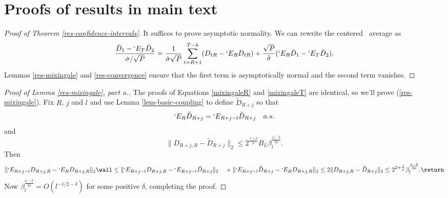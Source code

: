 \documentclass[11pt]{article}
\newcommand{\E}{`E}
\newcommand{\oosSum}[2]{\ensuremath{\sum_{#1=R+#2}^{T-\h}}}
\newcommand{\h}{h}
\newcommand{\CenteredAverage}{\frac{\bar{D}_1 - \E_T\bar{D}_2}{\hat\sigma / \sqrt{P}}}
\newcommand{\CenteredAverageI}{\ensuremath{\frac{1}{\hat\sigma
    \sqrt{P}}\oosSum{t}{1} (D_{tR} - \E_R D_{tR})}}
\newcommand{\CenteredAverageII}{\ensuremath{\frac{\sqrt{P}}{\hat\sigma}
    (\E_R\bar D_1 - \E_T\bar{D}_2)}}
\newcommand{\couplingConstant}{\ensuremath{2^{\frac{1+\rho}{\rho}} B_L}}
\newcommand{\couplingBeta}[1]{\ensuremath{\beta^{\frac{\rho-2}{2\rho}}_{#1}}}
\newcommand{\couplingBound}[1]{\couplingConstant \couplingBeta{#1}}
\begin{document}
\section{Proofs of results in main text}
\begin{proof}[Proof of Theorem \ref{res-confidence-intervals}]
It suffices to prove asymptotic normality.  We can rewrite the
centered \oos\ average as
  \[
    \CenteredAverage = \CenteredAverageI + \CenteredAverageII.
  \]
Lemmas \ref{res-mixingale} and 
\ref{res-convergence} ensure that the first term is asymptotically
normal and the second term vanishes.
\end{proof}

\begin{proof}[Proof of Lemma \ref{res-mixingale}, part a.]
The proofs of Equations \eqref{mixingaleR} and \eqref{mixingaleT} are
identical, so we'll prove (\ref{res-mixingale}).  Fix $R$, $j$ and $l$ and use Lemma
\ref{lem-basic-coupling} to define $\tilde{D}_{R+j}$ so that
\[\E_R\tilde D_{R+j} = \E_{R+j-l} \tilde D_{R+j} \quad a.s. \]
and
\[\lVert D_{R+j,R} - \tilde D_{R+j} \rVert_2 \leq \couplingBound{l}.\]
Then
\[
\lVert \E_{R+j-l} D_{R+j,R} - \E_R D_{R+j,R} \rVert_2 \wall \leq 
\lVert \E_{R+j-l} D_{R+j,R} - \E_{R+j-l} \tilde{D}_{R+j} \rVert_2 \\
\quad + \lVert
\E_{R+j-l} \tilde{D}_{R+j} - \E_R D_{R+j,R} \rVert_2 \\
\leq 2 \lVert D_{R+j,R} - \tilde D_{R+j} \rVert_2 \\
\leq 2^{2 + \frac1\rho}\couplingBeta{l}.\return
\]
Now $\couplingBeta{l} = O(l^{-1/2 - \delta})$ for some
positive $\delta$, completing the proof.
\end{proof}
\end{document}
